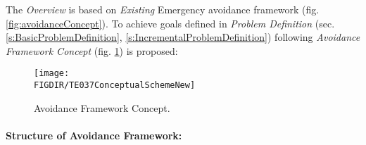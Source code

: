 \noindent The \emph{Overview} is based on \emph{Existing} Emergency avoidance framework \cite{gomola2017obstacle} (fig. \ref{fig:avoidanceConcept}). To achieve goals defined in \emph{Problem Definition} (sec. \ref{s:BasicProblemDefinition}, \ref{s:IncrementalProblemDefinition}) following \emph{Avoidance Framework Concept} (fig. \ref{fig:AvoidanceFrameworkConceptNew}) is proposed:

\begin{figure}[H]
    \centering
    \texttt{[image: \\FIGDIR/TE037ConceptualSchemeNew]} 
    \caption{Avoidance Framework Concept.}
    \label{fig:AvoidanceFrameworkConceptNew}
\end{figure}


\paragraph{Structure of Avoidance Framework:}

